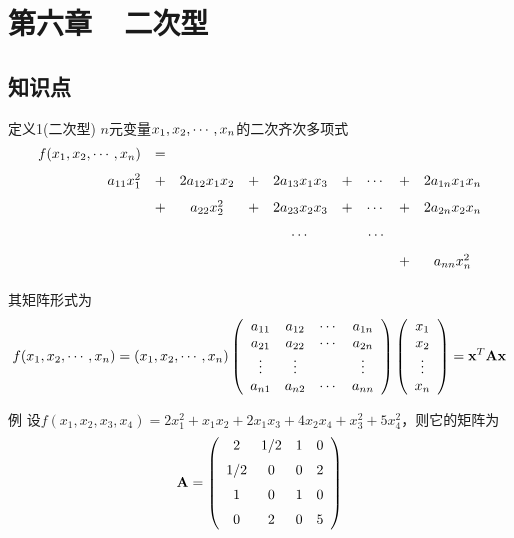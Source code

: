 \section{第六章~~二次型}

\subsection{知识点}

\begin{frame}
  \begin{footnotesize}
    \begin{block}{定义1(二次型)}
      $n$元变量$x_1,x_2,\cdots,x_n$的二次齐次多项式
      $$
      \begin{array}{rcccccccc}
        f(x_1,x_2,\cdots,x_n) &=& \\[0.1in]
        a_{11}x_1^2&+&2a_{12}x_1x_2&+&2a_{13}x_1x_3&+&\cdots&+&2a_{1n}x_1x_n\\[0.1in]
        &+&a_{22}x_2^2&+&2a_{23}x_2x_3&+&\cdots&+&2a_{2n}x_2x_n\\[0.1in]
        &&&&\cdots&&\cdots\\[0.1in]
        &&&&&&&+&a_{nn}x_n^2\\[0.1in]
      \end{array}
      $$
  其矩阵形式为
 $$
f(x_1,x_2,\cdots,x_n)=   (x_1,x_2,\cdots,x_n)\left(
      \begin{array}{cccc}
        a_{11}&a_{12}&\cdots&a_{1n}\\
        a_{21}&a_{22}&\cdots&a_{2n}\\
        \vdots&\vdots&&\vdots\\
        a_{n1}&a_{n2}&\cdots&a_{nn}\\
      \end{array}
      \right)\left(
      \begin{array}{c}
        x_1\\
        x_2\\
        \vdots\\
        x_n
      \end{array}\right) = \mathbf{x}^T\mathbf{A}\mathbf{x}
$$
    \end{block}
  \end{footnotesize}
\end{frame}

 


\begin{frame}
  \begin{footnotesize}
    \begin{exampleblock}{例}
      设$f(x_1,x_2,x_3,x_4)=2x_1^2+x_1x_2+2x_1x_3+4x_2x_4+x_3^2+5x_4^2$，则它的矩阵为
      $$
      \mathbf{A}=\left(
      \begin{array}{cccc}
        2&\displaystyle1/2&1&0\\[0.2cm]
        \displaystyle1/2&0&0&2\\[0.2cm]
        1&0&1&0\\[0.2cm]
        0&2&0&5
      \end{array}
      \right)
      $$
    \end{exampleblock}
  \end{footnotesize}
\end{frame}
 

